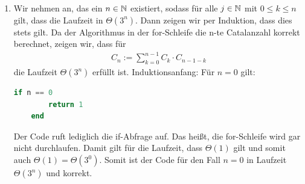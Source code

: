 \documentclass{scrartcl} %
\begin{document}
\begin{aufgabe}
\begin{enumerate}[label=(\alph*)]
\begin{proof}[Beweis durch vollständige Induktion]
                Induktionsvoraussetzung: Für ein beliebiges, aber festes $n \geq 1$ gelte:
                \[
                    2 \cdot \sum_{k = 0}^{n - 1}3^k = 3^n - 1
                \]
                Induktionsschritt: $(n \to n + 1)$:
                Es soll gelten:
                \begin{align*}
                    2 \cdot \sum_{k = 0}^{n + 1 - 1}3^k &\stackrel{!}{=} 3^{n + 1} - 1
                    \intertext{Wir vereinfachen:}
                    2 \cdot \sum_{k = 0}^{n + 1 - 1}3^k &= 2 \cdot \sum_{k = 0}^n 3^k\\
                    &= 2 \cdot \sum_{k = 0}^{n - 1}3^k + 2\cdot 3^n\\
                    &\stackrel{IV}{=}3^n - 1 + 2\cdot 3^n\\
                    &= 3^n \cdot (1 + 2) - 1\\
                    &= 3^n \cdot 3 - 1\\
                    &= 3^{n + 1} - 1
                \end{align*}
                Ist wahr.
            \end{proof}
            \item 
            Wir nehmen an, das ein $n \in \operatorname{\mathbb N}$ existiert, sodass für alle $j \in \operatorname{\mathbb N}$ mit $0\leq k \leq n$ gilt, dass die Laufzeit in $\Theta(3^n)$. Dann zeigen wir per Induktion, dass dies stets gilt. Da der Algorithmus in der {\ttfamily for}-Schleife die n-te Catalanzahl korrekt berechnet, zeigen wir, dass für 
            \begin{align*}
                C_n:=\sum_{k=0}^{n-1}C_k \cdot C_{n-1-k}
            \end{align*} die Laufzeit $\Theta(3^n)$ erfüllt ist.
            Induktionsanfang: Für $n=0$ gilt: 
            \begin{lstlisting}[language=Julia]
    if n == 0
        return 1
    end \end{lstlisting}
            Der Code ruft lediglich die {\ttfamily if}-Abfrage auf. Das heißt, die {\ttfamily for}-Schleife wird gar nicht durchlaufen. Damit gilt für die Laufzeit, dass $\Theta(1)$ gilt und somit auch $\Theta(1) = \Theta (3^0)$. Somit ist der Code für den Fall $n=0$ in Laufzeit $\Theta(3^n)$ und korrekt.
            

\end{enumerate}
\end{aufgabe}
\end{document}
